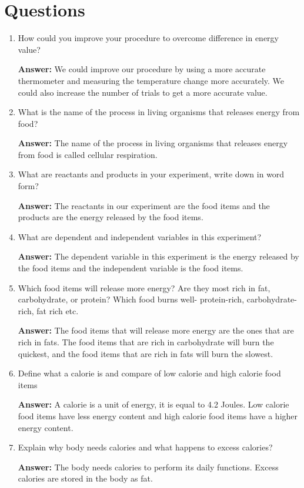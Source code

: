 \documentclass[a4paper, 12pt, english]{article}
\begin{document}
\section{Questions}
\begin{enumerate}
	\item How could you improve your procedure to overcome difference in energy value?

	      \textbf{Answer:}
	      We could improve our procedure by using a more accurate thermometer and
	      measuring the temperature change more accurately. We could also increase the
	      number of trials to get a more accurate value.

	\item What is the name of the process in living organisms that releases energy from
	      food?

	      \textbf{Answer:}
	      The name of the process in living organisms that releases energy from food is
	      called cellular respiration.

	\item What are reactants and products in your experiment, write down in word form?

	      \textbf{Answer:}
	      The reactants in our experiment are the food items and the products are the
	      energy released by the food items.

	\item What are dependent and independent variables in this experiment?

	      \textbf{Answer:}
	      The dependent variable in this experiment is the energy released by the food
	      items and the independent variable is the food items.

	\item Which food items will release more energy? Are they most rich in fat,
	      carbohydrate, or protein? Which food burns well- protein-rich,
	      carbohydrate-rich, fat rich etc.

	      \textbf{Answer:}
	      The food items that will release more energy are the ones that are rich in
	      fats. The food items that are rich in carbohydrate will burn the quickest,
	      and the food items that are rich in fats will burn the slowest.

	\item Define what a calorie is and compare of low calorie and high calorie food items

	      \textbf{Answer:}
	      A calorie is a unit of energy, it is equal to 4.2 Joules. Low calorie food items have less energy content and high calorie food items have a higher energy content.

	\item Explain why body needs calories and what happens to excess calories?

	      \textbf{Answer:}
	      The body needs calories to perform its daily functions. Excess calories are stored in the body as fat.
\end{enumerate}
\end{document}
